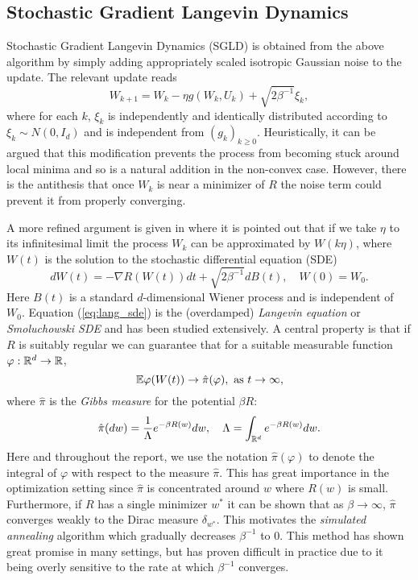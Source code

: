 \documentclass{article}
\begin{document}
\subsection{Stochastic Gradient Langevin Dynamics}
Stochastic Gradient Langevin Dynamics (SGLD) is obtained from the above algorithm by simply adding appropriately scaled isotropic Gaussian noise to the update. The relevant update reads
\begin{equation*}
    W_{k+1} = W_k - \eta g(W_k, U_k) + \sqrt{2 \beta^{-1}} \xi_k,
\end{equation*}
where for each \(k\), \(\xi_k\) is independently and identically distributed according to \(\xi_k \sim N(0, I_d)\) and is independent from \((g_k)_{k \geq 0}\). Heuristically, it can be argued that this modification prevents the process from becoming stuck around local minima and so is a natural addition in the non-convex case. However, there is the antithesis that once \(W_k\) is near a minimizer of \(R\) the noise term could prevent it from properly converging.

A more refined argument is given in \cite{Borkar1999AAlgorithms, Welling2011BayesianDynamics} where it is pointed out that if we take \(\eta\) to its infinitesimal limit the process \(W_k\) can be approximated by \(W(k\eta)\), where \(W(t)\) is the solution to the stochastic differential equation (SDE)
\begin{equation}\label{eq:lang_sde}
    dW(t) = - \nabla R(W(t)) dt + \sqrt{2\beta^{-1}} dB(t), \quad W(0) = W_0.
\end{equation}
Here \(B(t)\) is a standard \(d\)-dimensional Wiener process and is independent of \(W_0\). Equation (\ref{eq:lang_sde}) is the (overdamped) \textit{Langevin equation} or \textit{Smoluchowski SDE} \cite{Pavliotis2014StochasticApplications} and has been studied extensively. A central property is that if \(R\) is suitably regular we can guarantee that for a suitable measurable function \(\varphi: \Bbb{R}^d \to \Bbb{R}\),
\begin{equation}\label{eq:gibbs_cvgt}
    \Bbb{E}\varphi(W(t)) \to \hat{\pi}(\varphi), \text{ as } t \to \infty,
\end{equation}
where \(\hat{\pi}\) is the \textit{Gibbs measure} for the potential \(\beta R\):
\begin{equation}\label{eq:gibbs}
    \hat{\pi}(dw) = \frac{1}{\Lambda} e^{-\beta R(w)}dw, \quad \Lambda = \int_{\Bbb{R}^d} e^{-\beta R(w)} dw.
\end{equation}
Here and throughout the report, we use the notation \(\hat{\pi}(\varphi)\) to denote the integral of \(\varphi\) with respect to the measure \(\hat{\pi}\). This has great importance in the optimization setting since \(\hat{\pi}\) is concentrated around \(w\) where \(R(w)\) is small. Furthermore, if \(R\) has a single minimizer \(w^*\) it can be shown that as \(\beta \to \infty\), \(\hat{\pi}\) converges weakly to the Dirac measure \(\delta_{w^*}\). This motivates the \textit{simulated annealing} algorithm which gradually decreases \(\beta^{-1}\) to \(0\). This method has shown great promise in many settings, but has proven difficult in practice due to it being overly sensitive to the rate at which \(\beta^{-1}\) converges.
\end{document}
